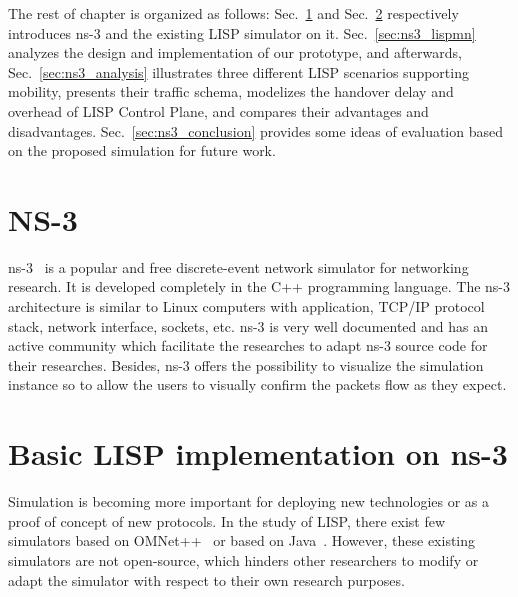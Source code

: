 The rest of chapter is organized as follows: Sec.~\ref{sec:ns3_ns3} and Sec.~\ref{sec:ns3_basic_lisp} respectively introduces ns-3 and the existing LISP simulator on it. Sec.~\ref{sec:ns3_lispmn} analyzes the design and implementation of our prototype, and afterwards, Sec.~\ref{sec:ns3_analysis} illustrates three different LISP scenarios supporting mobility, presents their traffic schema, modelizes the handover delay and overhead of LISP Control Plane, and compares their advantages and disadvantages. %
Sec.~\ref{sec:ns3_conclusion} provides some ideas of evaluation based on the proposed simulation for future work.

\section{NS-3}
\label{sec:ns3_ns3}
ns-3~\cite{ns3} is a popular and free discrete-event network simulator for networking research. It is developed completely in the C++ programming language. %
The ns-3 architecture is similar to Linux computers with application, TCP/IP protocol stack, network interface, sockets, etc. ns-3 is very well documented and has an active community which facilitate the researches to adapt ns-3 source code for their researches. Besides, ns-3 offers the possibility to visualize the simulation instance so to allow the users to visually confirm the packets flow as they expect. 

\section{Basic LISP implementation on ns-3}
\label{sec:ns3_basic_lisp}
Simulation is becoming more important for deploying new technologies or as a proof of concept of new protocols. In the study of LISP, there exist few simulators based on OMNet++~\cite{vesely2015locator, vesely2014multicast, klein2012integration} or based on Java~\cite{stockmayer2016jlisp}. However, these existing simulators are not open-source, which hinders other researchers to modify or adapt the simulator with respect to their own research purposes.


